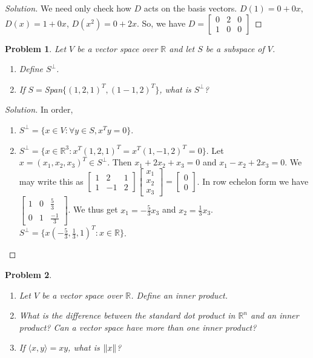 \documentclass{article}
\theoremstyle{mystyle}
\newtheorem{problem}{Problem}[section]
\begin{document}
\begin{proof}[Solution]
We need only check how $D$ acts on the basis vectors. $D(1) = 0+0x$, $D(x) = 1+0x$, $D(x^2) = 0+2x$. So, we have $D = \begin{bmatrix} 0 & 2 & 0 \\ 1 & 0 & 0 \end{bmatrix}$
\end{proof}
\begin{problem}
Let $V$ be a vector space over $\mathbb{R}$ and let $S$ be a subspace of $V$.
\begin{enumerate}
    \item Define $S^{\perp}$.
    \item If $S = $Span$\{ (1,2,1)^T, (1-1,2)^T\}$, what is $S^{\perp}$?
\end{enumerate}
\end{problem}
\begin{proof}[Solution]
In order,
\begin{enumerate}
    \item $S^{\perp} = \{x\in V: \forall y\in S, x^T y = 0\}$.
    \item $S^{\perp} = \{x\in \mathbb{R}^3: x^T (1,2,1)^T = x^T(1,-1,2)^T = 0\}$. Let $x = (x_1,x_2,x_3)^T \in S^{\perp}$. Then $x_1+2x_2+x_3=0$ and $x_1-x_2+2x_3 = 0$. We may write this as $\begin{bmatrix} 1 & 2 & 1 \\ 1 & -1 & 2 \end{bmatrix} \begin{bmatrix} x_1 \\ x_2\\ x_3 \end{bmatrix} = \begin{bmatrix} 0 \\ 0 \end{bmatrix}$. In row echelon form we have $\begin{bmatrix} 1 & 0 & \frac{5}{3} \\ 0 & 1 & \frac{-1}{3} \end{bmatrix}$. We thus get $x_1 = - \frac{5}{3}x_3$ and $x_2 = \frac{1}{3} x_3$.  $S^{\perp} = \{x(-\frac{5}{3}, \frac{1}{3}, 1)^T: x\in \mathbb{R}\}$.
\end{enumerate}
\end{proof}
\begin{problem}
\begin{enumerate}
    \item Let $V$ be a vector space over $\mathbb{R}$. Define an inner product.
    \item What is the difference between the standard dot product in $\mathbb{R}^n$ and an inner product? Can a vector space have more than one inner product?
    \item If $\langle x,y \rangle = xy$, what is $\norm{x}$?
\end{enumerate}
\end{problem}
\end{document}
